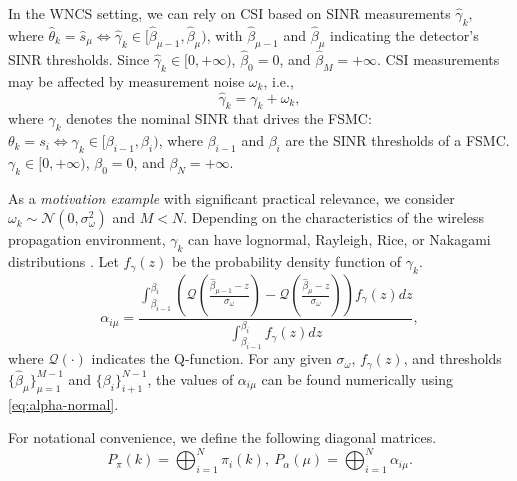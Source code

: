 \documentclass[journal,twoside,web]{ieeecolor}
\begin{document}
In the WNCS setting, we can rely on CSI based on SINR measurements $\hat{\gamma}_k$, where $\hat{\theta}_k = \hat{s}_{\mu} \Leftrightarrow\hat{\gamma}_k\in [\hat{\beta}_{\mu-1},\hat{\beta}_{\mu})$, with $\hat{\beta}_{\mu-1}$ and $\hat{\beta}_{\mu}$ indicating the detector's SINR thresholds. Since $\hat{\gamma}_k \in [0,+\infty)$, $\hat{\beta}_0 = 0$, and $\hat{\beta}_{M}=+\infty$. CSI measurements may be affected by measurement noise $\omega_k$, i.e., 
\begin{equation}\label{eq:gamma-hat}
    \hat{\gamma}_k = \gamma_k + \omega_k,
\end{equation}
where $\gamma_k$ denotes the nominal SINR that drives the FSMC: 
$\theta_k = s_{i} \Leftrightarrow\gamma_k\in [\beta_{i-1},\beta_{i})$, where $\beta_{i-1}$ and $\beta_{i}$ are the SINR thresholds of a FSMC. $\gamma_k \in [0,+\infty)$, $\beta_0 = 0$, and $\beta_{N}=+\infty$.

As a \emph{motivation example} with significant practical relevance, we consider $\omega_k \sim \mathcal{N}(0,\sigma_{\omega}^2)$ and $M<N$. 
Depending on the characteristics of the wireless propagation environment, $\gamma_k$ can have lognormal, Rayleigh, Rice, or Nakagami distributions \cite{stuber2017principles}. 
Let $f_{\gamma}(z)$ be the probability density function of $\gamma_k$. %
\begin{equation}\label{eq:alpha-normal}
    \alpha_{i\mu} = \frac{
    \int_{\beta_{i-1}}^{\beta_{i}}\left(
    \mathcal{Q}\left(\frac{\hat{\beta}_{\mu-1}-z}{\sigma_{\omega}}\right) - 
    \mathcal{Q}\left(\frac{\hat{\beta}_{\mu}-z}{\sigma_{\omega}}\right) 
    \right) f_{\gamma}(z)dz}{
    \int_{\beta_{i-1}}^{\beta_{i}} f_{\gamma}(z)dz},
\end{equation}
where $\mathcal{Q}(\cdot)$ indicates the Q-function. For any given $\sigma_{\omega}$, $f_{\gamma}(z)$, and %
thresholds $\{\hat{\beta}_{\mu}\}_{\mu=1}^{M-1}$ and $\{\beta_{i}\}_{i+1}^{N-1}$, the values of $\alpha_{i\mu}$ can be found numerically using \eqref{eq:alpha-normal}.

For notational convenience, we define the following diagonal matrices.
\begin{equation}\label{eq:diag-prob}
     P_{\pi}^{}(k) = \bigoplus_{i=1}^{N} \pi_{i}(k),~P_{\alpha}^{}(\mu) = \bigoplus_{i=1}^{N} \alpha_{i\mu}.
\end{equation}
\end{document}
